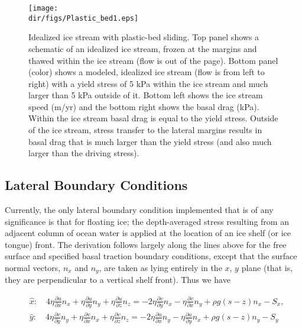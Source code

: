 \begin{figure}
  \begin{center}
    \texttt{[image: \\dir/figs/Plastic\_bed1.eps]}
  \end{center}
  \caption{Idealized ice stream with plastic-bed sliding. Top panel shows a schematic of an idealized ice stream, frozen at the margins and thawed within the ice stream (flow is out of the page). Bottom panel (color) shows a modeled, idealized ice stream (flow is from left to right) with a yield stress of 5 kPa within the ice stream and much larger than 5 kPa outside of it. Bottom left shows the ice stream speed (m/yr) and the bottom right shows the basal drag (kPa). Within the ice stream basal drag is equal to the yield stress. Outside of the ice stream, stress transfer to the lateral margins results in basal drag that is much larger than the yield stress (and also much larger than the driving stress).}
  \label{fig:plasticbed1}
\end{figure} 


\subsection{Lateral Boundary Conditions}
Currently, the only lateral boundary condition implemented that is of any significance is that for floating ice; the depth-averaged stress resulting from an adjacent column of ocean water is applied at the location of an ice shelf (or ice tongue) front. The derivation follows largely along the lines above for the free surface and specified basal traction boundary conditions, except that the surface normal vectors, $n_{x}$ and $n_{y}$, are taken as lying entirely in the $x$, $y$ plane (that is, they are perpendicular to a vertical shelf front). Thus we have

\begin{align*}
  & \hat{x}:\quad 4\eta \frac{\partial u}{\partial x}n_{x}+\eta \frac{\partial u}{\partial y}n_{y}+\eta \frac{\partial u}{\partial z}n_{z}=-2\eta \frac{\partial v}{\partial y}n_{x}-\eta \frac{\partial v}{\partial x}n_{y}+\rho g\left( s-z \right)n_{x}-S_{x}, \\ 
 & \hat{y}:\quad 4\eta \frac{\partial v}{\partial y}n_{y}+\eta \frac{\partial v}{\partial x}n_{x}+\eta \frac{\partial v}{\partial z}n_{z}=-2\eta \frac{\partial u}{\partial x}n_{y}-\eta \frac{\partial u}{\partial y}n_{x}+\rho g\left( s-z \right)n_{y}-S_{y} \\ 
\end{align*}

